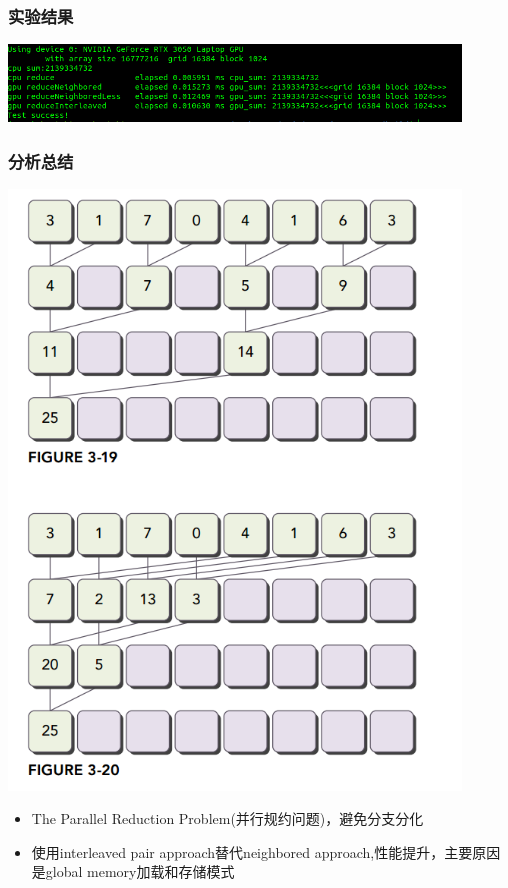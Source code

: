 \subsubsection{实验结果}
\noindent
\includegraphics[width=0.9\textwidth]{assets/sum.png}
\subsubsection{分析总结}
\noindent
\includegraphics[width=0.9\textwidth]{assets/interleave.png}
\begin{itemize}
	\item The Parallel Reduction Problem(并行规约问题)，避免分支分化
	\item 使用interleaved pair approach替代neighbored approach,性能提升，主要原因是global memory加载和存储模式
\end{itemize}


